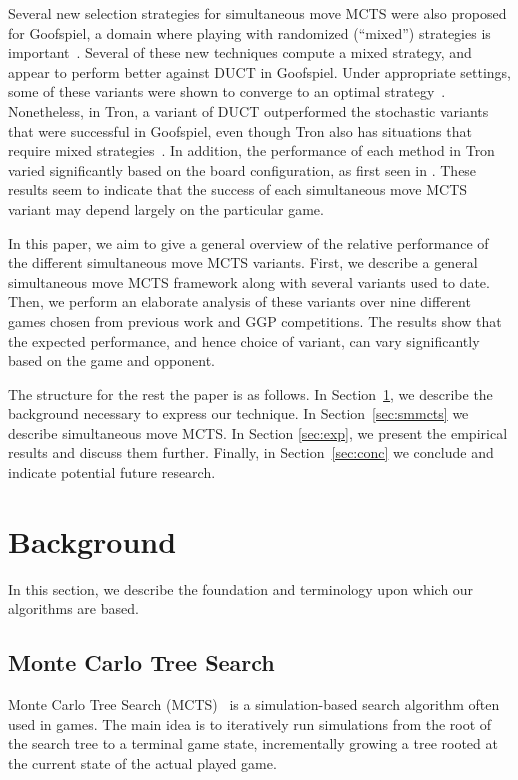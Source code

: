 \documentclass[conference]{IEEEtran}
\begin{document}
Several new selection strategies for simultaneous move MCTS were also proposed for Goofspiel, 
a domain where playing with randomized (``mixed'') strategies is important~\cite{Lanctot13Goofspiel}.
Several of these new techniques compute a mixed strategy, and appear to perform better against DUCT in Goofspiel. 
Under appropriate settings, some of these variants were shown to converge to an optimal strategy~\cite{Lisy13Computing}. 
Nonetheless, in Tron, a variant of DUCT outperformed the stochastic variants that were successful in Goofspiel, even though Tron 
also has situations that require mixed strategies~\cite{Lanctot13Tron}. 
In addition, the performance of each method in Tron varied significantly based on the board configuration, as first seen 
in \cite{DenTeuling12Tron}.
These results seem to indicate that the success of each simultaneous move MCTS variant may depend largely on the particular game. 

In this paper, we aim to give a general overview of the relative performance of the different simultaneous move MCTS variants. 
First, we describe a general simultaneous move MCTS framework along with several variants used to date. Then, we perform an 
elaborate analysis of these variants over nine different games chosen from previous work and GGP competitions. 
The results show that the expected performance, and hence choice of variant, can vary significantly based on the game and opponent. 

The structure for the rest the paper is as follows. In Section~\ref{sec:background}, we describe the background necessary to 
express our technique. In Section~\ref{sec:smmcts} we describe simultaneous move MCTS. In Section \ref{sec:exp}, we present 
the empirical results and discuss them further. Finally, in Section~\ref{sec:conc} we conclude and indicate potential future research.

\section{Background}
\label{sec:background}

In this section, we describe the foundation and terminology upon which our algorithms are based. 

\subsection{Monte Carlo Tree Search}

Monte Carlo Tree Search (MCTS)~\cite{Coulom06Efficient,Kocsis06Bandit} is a simulation-based 
search algorithm often used in games. The main idea is to iteratively run simulations from the root of the search tree to a terminal 
game state, incrementally growing a tree rooted at the current state of the actual played game. 
\end{document}
